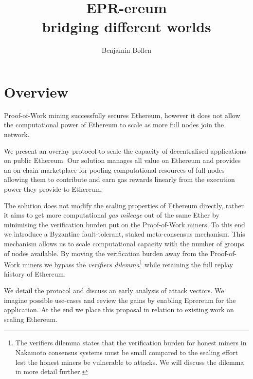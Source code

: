 \documentclass[twocolumn]{article}
\begin{document}
\title{EPR-ereum \\ bridging different worlds}
\author{Benjamin Bollen}
\maketitle
\section*{Overview}
Proof-of-Work mining successfully secures Ethereum, however it does not allow the computational power of Ethereum to scale as more full nodes join the network.

We present an overlay protocol to scale the capacity of decentralised applications on public Ethereum. Our solution manages all value on Ethereum and provides an on-chain marketplace for pooling computational resources of full nodes allowing them to contribute and earn gas rewards linearly from the execution power they provide to Ethereum.

The solution does not modify the scaling properties of Ethereum directly, rather it aims to get more computational \emph{gas mileage} out of the same Ether by minimising the verification burden put on the Proof-of-Work miners.  To this end we introduce a Byzantine fault-tolerant, staked meta-consensus mechanism. This mechanism allows us to scale computational capacity with the number of groups of nodes available.  By moving the verification burden away from the Proof-of-Work miners we bypass the \emph{verifiers dilemma}\footnote{The verifiers dilemma states that the verification burden for honest miners in Nakamoto consensus systems must be small compared to the sealing effort lest the honest miners be vulnerable to attacks. We will discuss the dilemma in more detail further.} while retaining the full replay history of Ethereum.

We detail the protocol and discuss an early analysis of attack vectors. We imagine possible use-cases and review the gains by enabling Eprereum for the application. At the end we place this proposal in relation to existing work on scaling Ethereum.
\end{document}
